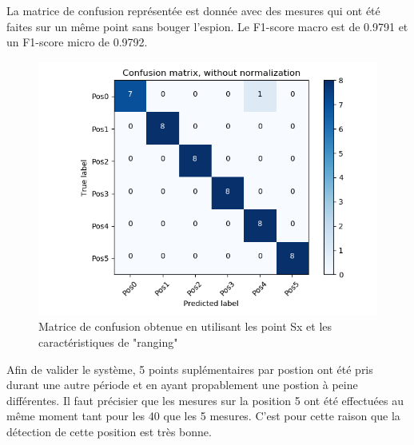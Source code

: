 La matrice de confusion représentée est donnée avec des mesures qui ont été faites sur un même point sans bouger l'espion. Le F1-score macro est de 0.9791 et un F1-score micro de 0.9792.  

\begin{figure}[htp]
	\begin{center}
		\includegraphics[scale=0.5]{figures/mat_pos_Sx_raw.png}
		\caption{Matrice de confusion obtenue en utilisant les point Sx et les caractéristiques de "ranging"}
		\label{fig:matPosSxTRaw} %
	\end{center}
\end{figure}

Afin de valider le système, 5 points suplémentaires par postion ont été pris durant une autre période et en ayant propablement une postion à peine différentes. Il faut précisier que les mesures sur la position 5 ont été effectuées au même moment tant pour les 40 que les 5 mesures. C'est pour cette raison que la détection de cette position est très bonne. 

